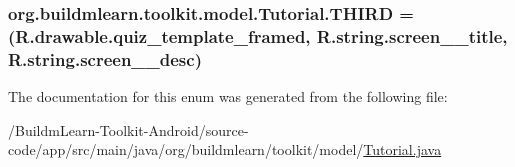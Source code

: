 \hypertarget{enumorg_1_1buildmlearn_1_1toolkit_1_1model_1_1Tutorial_a9cc74bacb34a8d3a0c7fa0dbadfc0786}{
\subsubsection[{T\-H\-I\-R\-D}]{\setlength{\rightskip}{0pt plus 5cm}org.\-buildmlearn.\-toolkit.\-model.\-Tutorial.\-T\-H\-I\-R\-D =(R.\-drawable.\-quiz\-\_\-template\-\_\-framed, R.\-string.\-screen\-\_\-\_\-title, R.\-string.\-screen\-\_\-\_\-desc)}}\label{enumorg_1_1buildmlearn_1_1toolkit_1_1model_1_1Tutorial_a9cc74bacb34a8d3a0c7fa0dbadfc0786}


The documentation for this enum was generated from the following file\-:\begin{DoxyCompactItemize}
\item 
/\-Buildm\-Learn-\/\-Toolkit-\/\-Android/source-\/code/app/src/main/java/org/buildmlearn/toolkit/model/\hyperlink{Tutorial_8java}{Tutorial.\-java}\end{DoxyCompactItemize}
